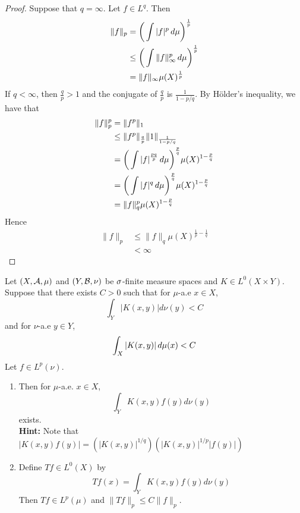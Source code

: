 \documentclass{book}
\begin{document}
	\begin{proof}
		Suppose that $q = \infty$. Let $f \in L^q$. Then
		\begin{align*}
			\|f \|_p 
			&= \bigg(\int | f |^p \, d \mu \bigg)^{\frac{1}{p}} \\
			& \leq \bigg(\int \| f \|_{\infty} ^p \, d \mu \bigg)^{\frac{1}{p}} \\
			&= \|f \|_{\infty} \mu(X)^{\frac{1}{p}}
		\end{align*} 
		If $q < \infty$, then $\frac{q}{p} > 1$ and the conjugate of $\frac{q}{p}$ is $\frac{1}{1- p/q}$. By Hölder's inequality, we have that 
		\begin{align*}
			\|f \|_p^p 
			&= \|f^p \|_1 \\
			&\leq \|f^p \|_{\frac{q}{p}} \|1 \|_{\frac{1}{1-p/q}} \\
			&= \bigg(\int |f|^{\frac{pq}{p}} \, d \mu \bigg)^{\frac{p}{q}} \mu(X)^{1-\frac{p}{q}} \\
			&= \bigg(\int |f|^{q} \, d \mu \bigg)^{\frac{p}{q}}\mu(X)^{1-\frac{p}{q}} \\
			&= \|f \|_q^p\mu(X)^{1-\frac{p}{q}}
		\end{align*}
		Hence 
		\begin{align*}
			\|f \|_p 
			&\leq \|f \|_q\mu(X)^{\frac{1}{p}-\frac{1}{q}} \\
			&< \infty
		\end{align*}
	\end{proof}
	
	\begin{ex}  
	Let $(X, \mathcal{A}, \mu)$ and $(Y, \mathcal{B}, \nu)$ be $\sigma$-finite measure spaces and $K\in L^0(X \times Y)$. Suppose that there exists $C > 0$ such that for $\mu$-a.e $x \in X$, $$\int_Y |K(x, y)| d \nu(y) < C$$ and for $\nu$-a.e $y \in Y$, $$\int_X |K(x, y)| \, d \mu(x) < C$$
	Let $f \in L^p(\nu)$.
	\begin{enumerate}
	\item Then for $\mu$-a.e. $x \in X$, $$\int_Y K(x,y) f(y) d \nu(y)$$ exists. \\
	\textbf{Hint:} Note that $|K(x, y) f(y)| = (|K(x,y)|^{1/q})(|K(x,y)|^{1/p}|f(y)|)$
	\item Define $Tf \in L^0(X)$ by $$Tf(x) = \int_Y K(x, y) f(y)d \nu(y)$$ Then $Tf \in L^p(\mu)$ and $\|Tf\|_p \leq C\|f\|_p$. 
	\end{enumerate}
	\end{ex}
	
\end{document}

